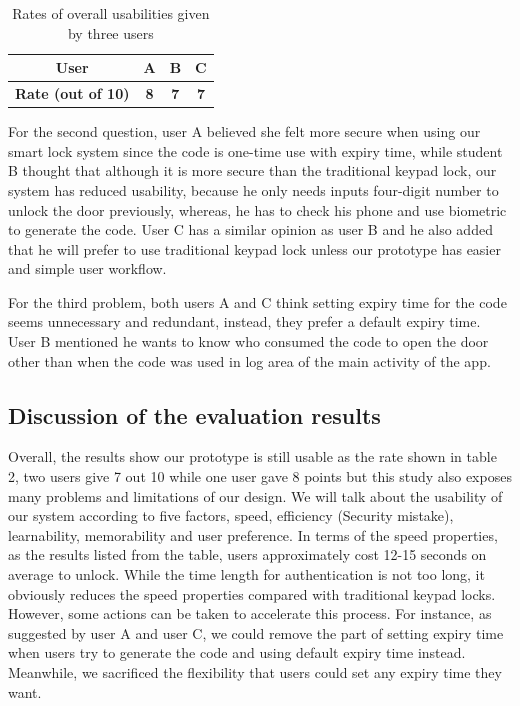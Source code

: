 \documentclass[conference]{IEEEtran}
\begin{document}
\begin{table}[htbp]
\caption{Rates of overall usabilities given by three users}
\begin{center}
\begin{tabular}{|c|c|c|c|}
\hline
\textbf{User}&\textbf{A}&\textbf{B}&\textbf{C} \\
\hline
\textbf{Rate (out of 10)} & \textbf{8} & \textbf{7} & \textbf{7} \\
\hline
\end{tabular}
\label{tab:rate}
\end{center}
\end{table}
For the second question, user A believed she felt more secure when using our smart lock system since the code is one-time use with expiry time, while student B thought that although it is more secure than the traditional keypad lock, our system has reduced usability, because he only needs inputs four-digit number to unlock the door previously, whereas, he has to check his phone and use biometric to generate the code. User C has a similar opinion as user B and he also added that he will prefer to use traditional keypad lock unless our prototype has easier and simple user workflow.

For the third problem, both users A and C think setting expiry time for the code seems unnecessary and redundant, instead, they prefer a default expiry time. User B mentioned he wants to know who consumed the code to open the door other than when the code was used in log area of the main activity of the app.

\subsection{Discussion of the evaluation results}
Overall, the results show our prototype is still usable as the rate shown in table 2, two users give 7 out 10 while one user gave 8 points but this study also exposes many problems and limitations of our design. We will talk about the usability of our system according to five factors, speed, efficiency (Security mistake), learnability, memorability and user preference.
In terms of the speed properties, as the results listed from the table, users approximately cost 12-15 seconds on average to unlock. While the time length for authentication is not too long, it obviously reduces the speed properties compared with traditional keypad locks. However, some actions can be taken to accelerate this process. For instance, as suggested by user A and user C, we could remove the part of setting expiry time when users try to generate the code and using default expiry time instead. Meanwhile, we sacrificed the flexibility that users could set any expiry time they want.
\end{document}
